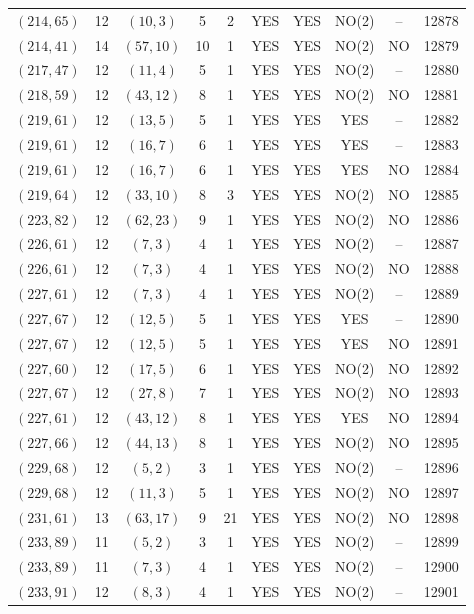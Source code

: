 \begin{longtable}{|c|c|c|c|c|c|c|c|c|c|}
$(214, 65)$ & 12 & $(10, 3)$ & 5 & 2 & YES & YES & NO(2) & -- & 12878\\
$(214, 41)$ & 14 & $(57, 10)$ & 10 & 1 & YES & YES & NO(2) & NO & 12879\\
$(217, 47)$ & 12 & $(11, 4)$ & 5 & 1 & YES & YES & NO(2) & -- & 12880\\
$(218, 59)$ & 12 & $(43, 12)$ & 8 & 1 & YES & YES & NO(2) & NO & 12881\\
$(219, 61)$ & 12 & $(13, 5)$ & 5 & 1 & YES & YES & YES & -- & 12882\\
$(219, 61)$ & 12 & $(16, 7)$ & 6 & 1 & YES & YES & YES & -- & 12883\\
$(219, 61)$ & 12 & $(16, 7)$ & 6 & 1 & YES & YES & YES & NO & 12884\\
$(219, 64)$ & 12 & $(33, 10)$ & 8 & 3 & YES & YES & NO(2) & NO & 12885\\
$(223, 82)$ & 12 & $(62, 23)$ & 9 & 1 & YES & YES & NO(2) & NO & 12886\\
$(226, 61)$ & 12 & $(7, 3)$ & 4 & 1 & YES & YES & NO(2) & -- & 12887\\
$(226, 61)$ & 12 & $(7, 3)$ & 4 & 1 & YES & YES & NO(2) & NO & 12888\\
$(227, 61)$ & 12 & $(7, 3)$ & 4 & 1 & YES & YES & NO(2) & -- & 12889\\
$(227, 67)$ & 12 & $(12, 5)$ & 5 & 1 & YES & YES & YES & -- & 12890\\
$(227, 67)$ & 12 & $(12, 5)$ & 5 & 1 & YES & YES & YES & NO & 12891\\
$(227, 60)$ & 12 & $(17, 5)$ & 6 & 1 & YES & YES & NO(2) & NO & 12892\\
$(227, 67)$ & 12 & $(27, 8)$ & 7 & 1 & YES & YES & NO(2) & NO & 12893\\
$(227, 61)$ & 12 & $(43, 12)$ & 8 & 1 & YES & YES & YES & NO & 12894\\
$(227, 66)$ & 12 & $(44, 13)$ & 8 & 1 & YES & YES & NO(2) & NO & 12895\\
$(229, 68)$ & 12 & $(5, 2)$ & 3 & 1 & YES & YES & NO(2) & -- & 12896\\
$(229, 68)$ & 12 & $(11, 3)$ & 5 & 1 & YES & YES & NO(2) & NO & 12897\\
$(231, 61)$ & 13 & $(63, 17)$ & 9 & 21 & YES & YES & NO(2) & NO & 12898\\
$(233, 89)$ & 11 & $(5, 2)$ & 3 & 1 & YES & YES & NO(2) & -- & 12899\\
$(233, 89)$ & 11 & $(7, 3)$ & 4 & 1 & YES & YES & NO(2) & -- & 12900\\
$(233, 91)$ & 12 & $(8, 3)$ & 4 & 1 & YES & YES & NO(2) & -- & 12901\\

\end{longtable}
